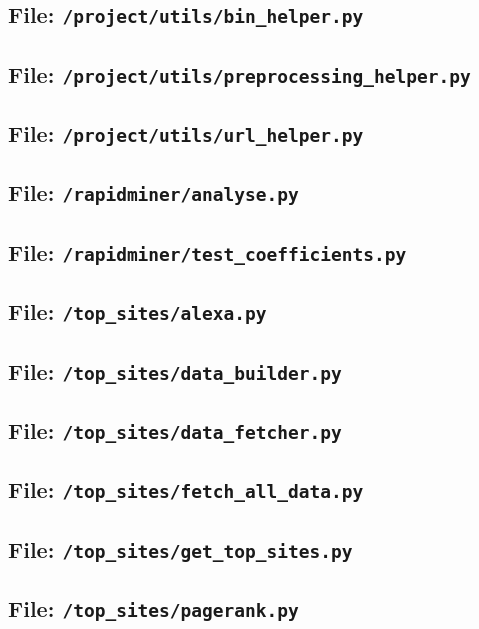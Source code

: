 \subsection{File: \texttt{/project/utils/bin\_helper.py}}
\subsection{File: \texttt{/project/utils/preprocessing\_helper.py}}
\subsection{File: \texttt{/project/utils/url\_helper.py}}
\subsection{File: \texttt{/rapidminer/analyse.py}}
\subsection{File: \texttt{/rapidminer/test\_coefficients.py}}
\subsection{File: \texttt{/top\_sites/alexa.py}}
\subsection{File: \texttt{/top\_sites/data\_builder.py}}
\subsection{File: \texttt{/top\_sites/data\_fetcher.py}}
\subsection{File: \texttt{/top\_sites/fetch\_all\_data.py}}
\subsection{File: \texttt{/top\_sites/get\_top\_sites.py}}
\subsection{File: \texttt{/top\_sites/pagerank.py}}
